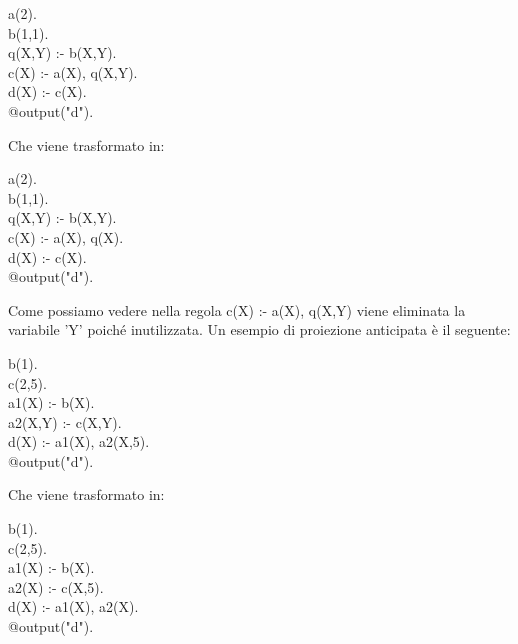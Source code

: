 \begin{algorithm}[h]
	a(2). \\
	b(1,1). \\
	q(X,Y) :- b(X,Y). \\
	c(X) :- a(X), q(X,Y). \\
	d(X) :- c(X). \\
	@output("d").
\end{algorithm}

Che viene trasformato in:

\begin{algorithm}[h]
	a(2). \\
	b(1,1). \\
	q(X,Y) :- b(X,Y). \\
	c(X) :- a(X), q(X). \\
	d(X) :- c(X). \\
	@output("d").
\end{algorithm}

Come possiamo vedere nella regola c(X) :- a(X), q(X,Y) viene eliminata la variabile 'Y' poiché inutilizzata. \newline
Un esempio di proiezione anticipata è il seguente: 

\begin{algorithm}[h]
	b(1). \\
	c(2,5). \\
	a1(X) :- b(X). \\
	a2(X,Y) :- c(X,Y). \\
	d(X) :- a1(X), a2(X,5). \\
	@output("d").
\end{algorithm}

Che viene trasformato in:

\begin{algorithm}[h]
	b(1). \\
	c(2,5). \\
	a1(X) :- b(X). \\
	a2(X) :- c(X,5). \\
	d(X) :- a1(X), a2(X). \\
	@output("d").
\end{algorithm}

